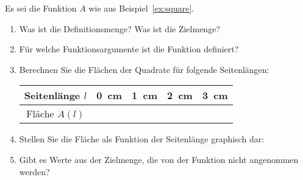 \documentclass[12pt]{article}
\begin{document}
\newpage
\begin{exercise}
Es sei die Funktion $A$ wie aus Beispiel~\ref{ex:square}.
\begin{enumerate}[label=\alph*)]
\item Was ist die Definitionsmenge? Was ist die Zielmenge?
\item Für welche Funktionsargumente ist die Funktion definiert?
\item Berechnen Sie die Flächen der Quadrate für folgende Seitenlängen:\\[1em]
\begin{tabularx}{\linewidth} {c| *{4}{Y|} }
\toprule
Seitenlänge $l$ & 0~cm & 1~cm & 2~cm & 3~cm\\
\hline
Fläche $A(l)$ & \hspace{1.5cm} & \hspace{1.5cm}&\hspace{1.5cm} & 
\\[1cm]
\bottomrule
\end{tabularx}
\item Stellen Sie die Fläche als Funktion der Seitenlänge graphisch dar:\\
\begin{center}
\end{center}
\item Gibt es Werte aus der Zielmenge, die von der Funktion nicht angenommen werden?\\
\vspace*{0.5cm}
\end{enumerate}
\end{exercise}
\newpage
\end{document}
